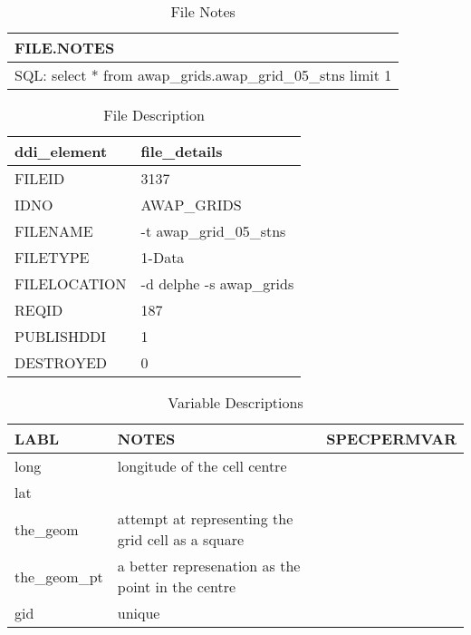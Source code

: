\documentclass[a4paper]{article}
\begin{document}
\begin{table}[ht]
\begin{center}
\caption{File Notes}
\label{tab:tabx}
\begin{tabular}{p{10cm}}
  \hline
FILE.NOTES \\ 
  \hline
SQL: select * from awap\_grids.awap\_grid\_05\_stns limit 1 \\ 
   \hline
\end{tabular}
\end{center}
\end{table}
\begin{table}[ht]
\begin{center}
\caption{File Description}
\label{tab:tabx}
\begin{tabular}{p{4cm}p{9cm}}
  \hline
ddi\_element & file\_details \\ 
  \hline
FILEID & 3137 \\ 
  IDNO & AWAP\_GRIDS \\ 
  FILENAME & -t awap\_grid\_05\_stns \\ 
  FILETYPE & 1-Data \\ 
  FILELOCATION & -d delphe -s awap\_grids \\ 
  REQID & 187 \\ 
  PUBLISHDDI & 1 \\ 
  DESTROYED & 0 \\ 
   \hline
\end{tabular}
\end{center}
\end{table}
\begin{table}[ht]
\begin{center}
\caption{Variable Descriptions}
\label{tab:tabx}
\begin{tabular}{p{3cm}p{5cm}p{5cm}}
  \hline
LABL & NOTES & SPECPERMVAR \\ 
  \hline
long & longitude of the cell centre &  \\ 
  lat &  &  \\ 
  the\_geom & attempt at representing the grid cell as a square &  \\ 
  the\_geom\_pt & a better represenation as the point in the centre &  \\ 
  gid & unique &  \\ 
   \hline
\end{tabular}
\end{center}
\end{table}\clearpage
\end{document}
